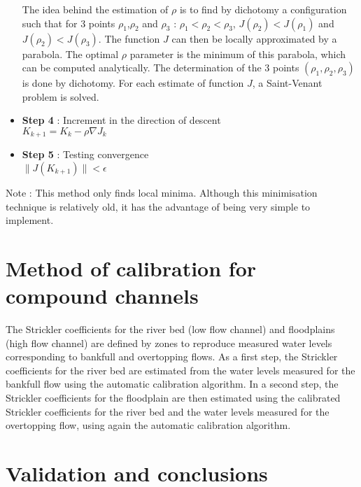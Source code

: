 \begin{itemize}
    The idea behind the estimation of $\rho$ is to find by dichotomy a configuration such that for 3 points $\rho_1$,$\rho_2$ and $\rho_3$ : $\rho_1<\rho_2<\rho_3$, $J(\rho_2)<J(\rho_1)$ and $J(\rho_2)<J(\rho_3)$.
    The function $J$ can then be locally approximated by a parabola. The optimal $\rho$ parameter is the minimum of this parabola, which can be computed analytically.
    The determination of the 3 points $(\rho_1,\rho_2,\rho_3)$ is done by dichotomy. For each estimate of function $J$, a Saint-Venant problem is solved.
  \item \textbf{Step 4} : Increment in the direction of descent \\
    $K_{k+1} = K_{k} - \rho \nabla J_{k}$
  \item \textbf{Step 5} : Testing convergence \\
    $\| J(K_{k+1}) \|< \epsilon$
\end{itemize}

\begin{CommentBlock}{Note :}
This method only finds local minima. Although this minimisation technique is relatively old, it has the advantage of being very simple to implement.
\end{CommentBlock}

\section{Method of calibration for compound channels}

The Strickler coefficients for the river bed (low flow channel) and floodplains (high flow channel) are defined by zones to reproduce measured water levels corresponding to bankfull and overtopping flows. As a first step, the Strickler coefficients for the river bed are estimated from the water levels measured for the bankfull flow using the automatic calibration algorithm. In a second step, the Strickler coefficients for the floodplain are then estimated using the calibrated Strickler coefficients for the river bed and the water levels measured for the overtopping flow, using again the automatic calibration algorithm.

\section{Validation and conclusions}

